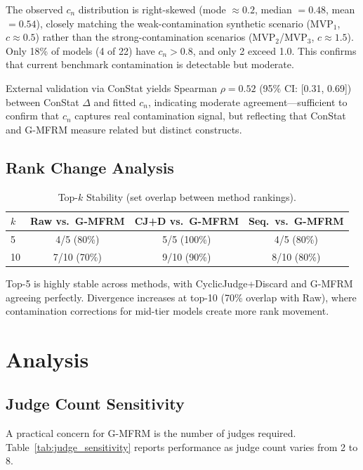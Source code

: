 \documentclass[11pt]{article}
\newcommand{\gmfrm}{G-MFRM}
\newcommand{\cn}{c_n}
\begin{document}
The observed $\cn$ distribution is right-skewed (mode $\approx 0.2$, median $= 0.48$, mean $= 0.54$), closely matching the weak-contamination synthetic scenario (MVP$_1$, $c \approx 0.5$) rather than the strong-contamination scenarios (MVP$_2$/MVP$_3$, $c \approx 1.5$).
Only 18\% of models (4 of 22) have $\cn > 0.8$, and only 2 exceed 1.0.
This confirms that current benchmark contamination is detectable but moderate.

External validation via ConStat yields Spearman $\rho = 0.52$ (95\% CI: [0.31, 0.69]) between ConStat $\Delta$ and fitted $\cn$, indicating moderate agreement---sufficient to confirm that $\cn$ captures real contamination signal, but reflecting that ConStat and G-MFRM measure related but distinct constructs.

\subsection{Rank Change Analysis}

\begin{table}[t]
\centering
\caption{Top-$k$ Stability (set overlap between method rankings).}
\label{tab:topk}
\begin{tabular}{lccc}
\toprule
$k$ & Raw vs.\ \gmfrm{} & CJ+D vs.\ \gmfrm{} & Seq.\ vs.\ \gmfrm{} \\
\midrule
5 & 4/5 (80\%) & 5/5 (100\%) & 4/5 (80\%) \\
10 & 7/10 (70\%) & 9/10 (90\%) & 8/10 (80\%) \\
\bottomrule
\end{tabular}
\end{table}

Top-5 is highly stable across methods, with CyclicJudge+Discard and \gmfrm{} agreeing perfectly.
Divergence increases at top-10 (70\% overlap with Raw), where contamination corrections for mid-tier models create more rank movement.

\section{Analysis}

\subsection{Judge Count Sensitivity}

A practical concern for \gmfrm{} is the number of judges required.
Table~\ref{tab:judge_sensitivity} reports performance as judge count varies from 2 to 8.
\end{document}

